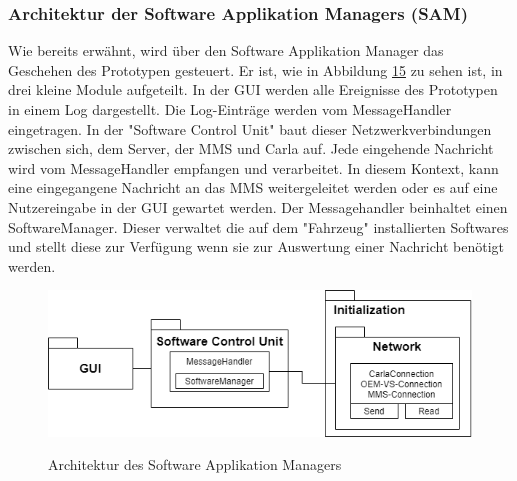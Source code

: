 \subsubsection{Architektur der Software Applikation Managers (SAM)}
Wie bereits erwähnt, wird über den Software Applikation Manager das Geschehen des Prototypen gesteuert. Er ist, wie in Abbildung \hyperref[img:sam]{15} zu sehen ist, in drei kleine Module aufgeteilt. In der GUI werden alle Ereignisse des Prototypen in einem Log dargestellt. Die Log-Einträge werden vom MessageHandler eingetragen. In der "Software Control Unit" baut dieser Netzwerkverbindungen zwischen sich, dem Server, der MMS und Carla auf. Jede eingehende Nachricht wird vom MessageHandler empfangen und verarbeitet. In diesem Kontext, kann eine eingegangene Nachricht an das MMS weitergeleitet werden oder es auf eine Nutzereingabe in der GUI gewartet werden. Der Messagehandler beinhaltet einen SoftwareManager. Dieser verwaltet die auf dem "Fahrzeug" installierten Softwares und stellt diese zur Verfügung wenn sie zur Auswertung einer Nachricht benötigt werden.
\begin{figure}[!h]
	\centering
	\includegraphics[width=0.8\columnwidth]{pictures/konzept-SAM.png}
	\label{img:sam}
	\caption{Architektur des Software Applikation Managers}
\end{figure}

